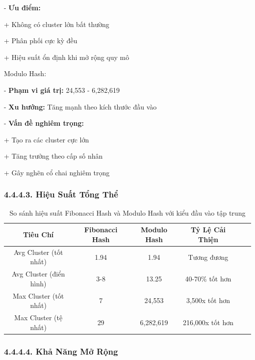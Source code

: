 \documentclass[12pt,a4paper]{report}
\begin{document}
    - \textbf{Ưu điểm:}

        \hspace{0.5cm}+ Không có cluster lớn bất thường
        
        \hspace{0.5cm}+ Phân phối cực kỳ đều
        
        \hspace{0.5cm}+ Hiệu suất ổn định khi mở rộng quy mô

Modulo Hash:

    - \textbf{Phạm vi giá trị:} 24,553 - 6,282,619
    
    - \textbf{Xu hướng:} Tăng mạnh theo kích thước đầu vào
    
    - \textbf{Vấn đề nghiêm trọng:}

        \hspace{0.5cm}+ Tạo ra các cluster cực lớn
        
        \hspace{0.5cm}+ Tăng trưởng theo cấp số nhân
        
        \hspace{0.5cm}+ Gây nghẽn cổ chai nghiêm trọng

\subsubsection*{4.4.4.3. Hiệu Suất Tổng Thể}

\begin{table}[h!]
\centering
\begin{tabular}{|c|c|c|c|c|c|}
\hline
\textbf{Tiêu Chí} & \textbf{Fibonacci Hash} & \textbf{Modulo Hash} & \textbf{Tỷ Lệ Cải Thiện} \\
\hline
Avg Cluster (tốt nhất) & 1.94 & 1.94 & Tương đương \\
Avg Cluster (điển hình) & 3-8 & 13.25 & 40-70\% tốt hơn \\
Max Cluster (tốt nhất) & 7 & 24,553 & 3,500x tốt hơn \\
Max Cluster (tệ nhất) & 29 & 6,282,619 & 216,000x tốt hơn \\
\hline
\end{tabular}
\caption{So sánh hiệu suất Fibonacci Hash và Modulo Hash với kiểu đầu vào tập trung}
\end{table}

\subsubsection*{4.4.4.4. Khả Năng Mở Rộng}
\end{document}
